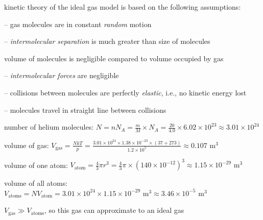 \begin{ilight}
	
kinetic theory of the ideal gas model is based on the following assumptions:

\begin{compactitem}
	
\item[--] gas molecules are in constant \emph{random} motion
	
\item[--] \emph{intermolecular separation} is much greater than size of molecules

volume of molecules is negligible compared to volume occupied by gas

\item[--] \emph{intermolecular forces} are negligible

\item[--] collisions between molecules are perfectly \emph{elastic}, i.e., no kinetic energy lost

\item[--] molecules travel in straight line between collisions
\end{compactitem}

\end{ilight}


\begin{soln}
    
number of helium molecules: $N = nN_A = \frac{m}{M} \times N_A = \frac{20}{4.0} \times 6.02\times10^{23} \approx 3.01\times10^{24} $

\eqyskip

volume of gas: $V_\text{gas} = \frac{NkT}{p} = \frac{3.01\times10^{24}\times1.38\times10^{-23}\times (37+273)}{1.2\times10^5} \approx 0.107 \text{ m}^3$

\eqyskip

volume of one atom: $V_\text{atom} = \frac{4}{3}\pi r^3 = \frac{4}{3} \pi\times(140\times10^{-12})^3 \approx 1.15\times10^{-29} \text{ m}^3$

volume of all atoms: $V_\text{atoms} = N V_\text{atom} = 3.01\times10^{24} \times 1.15\times10^{-29} \text{ m}^3 \approx 3.46 \times 10^{-5} \text{ m}^{3}$

$V_\text{gas} \gg V_\text{atoms}$, so this gas can approximate to an ideal gas \end{soln}


